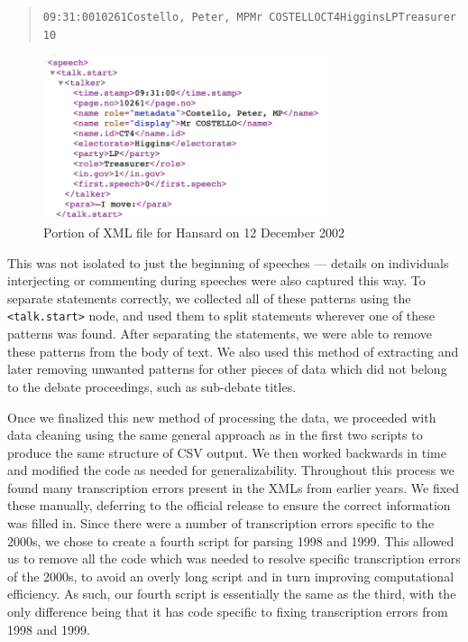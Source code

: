 \documentclass[
  letterpaper,
  DIV=11,
  numbers=noendperiod]{scrartcl}
\begin{document}
\begin{quote}
\texttt{09:31:0010261Costello,\ Peter,\ MPMr\ COSTELLOCT4HigginsLPTreasurer10}
\end{quote}

\begin{figure}

{\centering \includegraphics[width=3.28125in,height=\textheight]{images/patternEX.png}

}

\caption{\label{fig-patternEX}Portion of XML file for Hansard on 12
December 2002}

\end{figure}

This was not isolated to just the beginning of speeches --- details on
individuals interjecting or commenting during speeches were also
captured this way. To separate statements correctly, we collected all of
these patterns using the \texttt{\textless{}talk.start\textgreater{}}
node, and used them to split statements wherever one of these patterns
was found. After separating the statements, we were able to remove these
patterns from the body of text. We also used this method of extracting
and later removing unwanted patterns for other pieces of data which did
not belong to the debate proceedings, such as sub-debate titles.

Once we finalized this new method of processing the data, we proceeded
with data cleaning using the same general approach as in the first two
scripts to produce the same structure of CSV output. We then worked
backwards in time and modified the code as needed for generalizability.
Throughout this process we found many transcription errors present in
the XMLs from earlier years. We fixed these manually, deferring to the
official release to ensure the correct information was filled in. Since
there were a number of transcription errors specific to the 2000s, we
chose to create a fourth script for parsing 1998 and 1999. This allowed
us to remove all the code which was needed to resolve specific
transcription errors of the 2000s, to avoid an overly long script and in
turn improving computational efficiency. As such, our fourth script is
essentially the same as the third, with the only difference being that
it has code specific to fixing transcription errors from 1998 and 1999.
\end{document}
